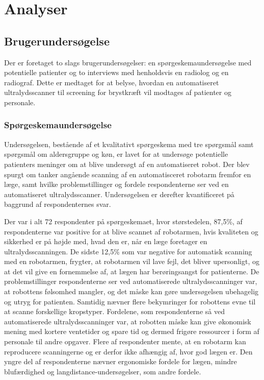 \chapter{Analyser}\label{Analyser}

\section{Brugerundersøgelse}
Der er foretaget to slags brugerundersøgelser: en spørgeskemaundersøgelse med potentielle patienter og to interviews med henholdsvis en radiolog og en radiograf. Dette er medtaget for at belyse, hvordan en automatiseret ultralydsscanner til screening for brystkræft vil modtages af patienter og personale. 

\subsection{Spørgeskemaundersøgelse}
Undersøgelsen, bestående af et kvalitativt spørgeskema med tre spørgsmål samt spørgsmål om aldersgruppe og køn, er lavet for at undersøge potentielle patienters meninger om at blive undersøgt af en automatiseret robot. Der blev spurgt om tanker angående scanning af en automatisceret  robotarm fremfor en læge, samt hvilke problemstillinger og fordele respondenterne ser ved en automatiseret ultralydsscanner. Undersøgelsen er derefter kvantificeret på baggrund af respondenternes svar. 

Der var i alt 72 respondenter på spørgeskemaet, hvor størstedelen, 87,5\%, af respondenterne var positive for at blive scannet af robotarmen, hvis kvaliteten og sikkerhed er på højde med, hvad den er, når en læge foretager en ultralydsscanningen. De sidste 12,5\% som var negative for automatisk scanning med en robotarmen, frygter, at robotarmen vil lave fejl, det bliver upersonligt, og at det vil give en fornemmelse af, at lægen har berøringsangst for patienterne. 
De problemstillinger respondenterne ser ved automatiserede ultralydsscanninger var, at robottens følsomhed mangler, og det måske kan gøre undersøgelsen ubehagelig og utryg for patienten. Samtidig nævner flere bekymringer for robottens evne til at scanne forskellige kropstyper. Fordelene, som respondenterne så ved automatiserede ultralydsscanninger var, at robotten måske kan give økonomisk mening med kortere ventetider og spare tid og dermed frigøre ressourcer i form af personale til andre opgaver. Flere af respondenter mente, at en robotarm kan reproducere scanningerne og er derfor ikke afhængig af, hvor god lægen er. Den yngre del af respondenterne nævner ergonomiske fordele for lægen, mindre blufærdighed og langdistance-undersøgelser, som andre fordele. 

